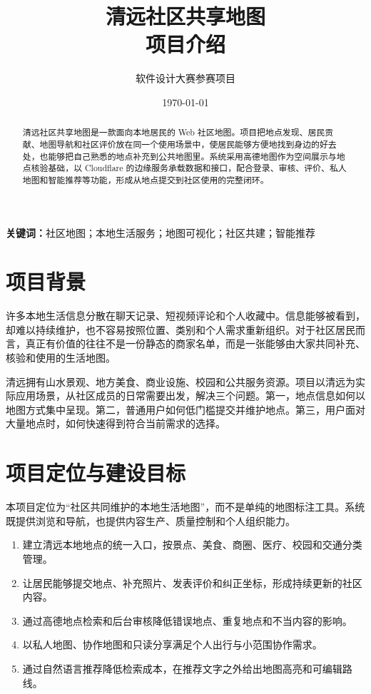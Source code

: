\documentclass[UTF8,a4paper,12pt]{ctexart}
\title{\heiti 清远社区共享地图\\[0.4em]\large 项目介绍}
\author{软件设计大赛参赛项目}
\date{\today}
\begin{document}
\maketitle

\begin{abstract}
清远社区共享地图是一款面向本地居民的 Web 社区地图。项目把地点发现、居民贡献、地图导航和社区评价放在同一个使用场景中，使居民能够方便地找到身边的好去处，也能够把自己熟悉的地点补充到公共地图里。系统采用高德地图作为空间展示与地点核验基础，以 Cloudflare 的边缘服务承载数据和接口，配合登录、审核、评价、私人地图和智能推荐等功能，形成从地点提交到社区使用的完整闭环。
\end{abstract}
\noindent\textbf{关键词：}社区地图；本地生活服务；地图可视化；社区共建；智能推荐

\section{项目背景}

许多本地生活信息分散在聊天记录、短视频评论和个人收藏中。信息能够被看到，却难以持续维护，也不容易按照位置、类别和个人需求重新组织。对于社区居民而言，真正有价值的往往不是一份静态的商家名单，而是一张能够由大家共同补充、核验和使用的生活地图。

清远拥有山水景观、地方美食、商业设施、校园和公共服务资源。项目以清远为实际应用场景，从社区成员的日常需要出发，解决三个问题。第一，地点信息如何以地图方式集中呈现。第二，普通用户如何低门槛提交并维护地点。第三，用户面对大量地点时，如何快速得到符合当前需求的选择。

\section{项目定位与建设目标}

本项目定位为“社区共同维护的本地生活地图”，而不是单纯的地图标注工具。系统既提供浏览和导航，也提供内容生产、质量控制和个人组织能力。

\begin{enumerate}
  \item 建立清远本地地点的统一入口，按景点、美食、商圈、医疗、校园和交通分类管理。
  \item 让居民能够提交地点、补充照片、发表评价和纠正坐标，形成持续更新的社区内容。
  \item 通过高德地点检索和后台审核降低错误地点、重复地点和不当内容的影响。
  \item 以私人地图、协作地图和只读分享满足个人出行与小范围协作需求。
  \item 通过自然语言推荐降低检索成本，在推荐文字之外给出地图高亮和可编辑路线。
\end{enumerate}
\end{document}
